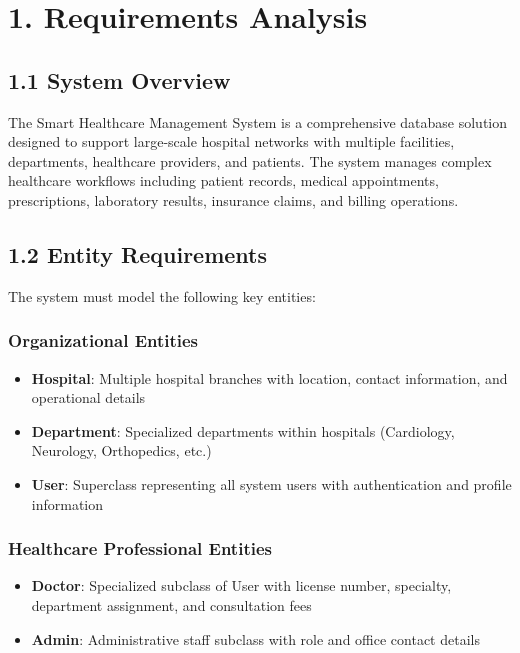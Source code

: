 \newpage
\section{1. Requirements Analysis}

\subsection*{1.1 System Overview}

The Smart Healthcare Management System is a comprehensive database solution designed to support large-scale hospital networks with multiple facilities, departments, healthcare providers, and patients. The system manages complex healthcare workflows including patient records, medical appointments, prescriptions, laboratory results, insurance claims, and billing operations.

\subsection*{1.2 Entity Requirements}

The system must model the following key entities:

\subsubsection*{Organizational Entities}
\begin{itemize}
    \item \textbf{Hospital}: Multiple hospital branches with location, contact information, and operational details
    \item \textbf{Department}: Specialized departments within hospitals (Cardiology, Neurology, Orthopedics, etc.)
    \item \textbf{User}: Superclass representing all system users with authentication and profile information
\end{itemize}

\subsubsection*{Healthcare Professional Entities}
\begin{itemize}
    \item \textbf{Doctor}: Specialized subclass of User with license number, specialty, department assignment, and consultation fees
    \item \textbf{Admin}: Administrative staff subclass with role and office contact details
\end{itemize}


